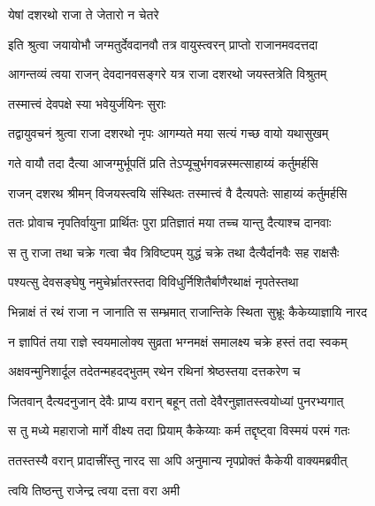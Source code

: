 \onelineshloka
{येषां दशरथो राजा ते जेतारो न चेतरे} %


\twolineshloka
{इति श्रुत्वा जयायोभौ जग्मतुर्देवदानवौ}
{तत्र वायुस्त्वरन् प्राप्तो राजानमवदत्तदा} %



\twolineshloka
{आगन्तव्यं त्वया राजन् देवदानवसङ्गरे}
{यत्र राजा दशरथो जयस्तत्रेति विश्रुतम्} %

\onelineshloka
{तस्मात्त्वं देवपक्षे स्या भवेयुर्जयिनः सुराः}%



\twolineshloka
{तद्वायुवचनं श्रुत्वा राजा दशरथो नृपः}
{आगम्यते मया सत्यं गच्छ वायो यथासुखम्} %

\twolineshloka
{गते वायौ तदा दैत्या आजग्मुर्भूपतिं प्रति}
{तेऽप्यूचुर्भगवन्नस्मत्साहाय्यं कर्तुमर्हसि} %

\twolineshloka
{राजन् दशरथ श्रीमन् विजयस्त्वयि संस्थितः}
{तस्मात्त्वं वै दैत्यपतेः साहाय्यं कर्तुमर्हसि} %

\twolineshloka
{ततः प्रोवाच नृपतिर्वायुना प्रार्थितः पुरा}
{प्रतिज्ञातं मया तच्च यान्तु दैत्याश्च दानवाः} %

\twolineshloka
{स तु राजा तथा चक्रे गत्वा चैव त्रिविष्टपम्}
{युद्धं चक्रे तथा दैत्यैर्दानवैः सह राक्षसैः} %

\twolineshloka
{पश्यत्सु देवसङ्घेषु नमुचेर्भ्रातरस्तदा}
{विविधुर्निशितैर्बाणैरथाक्षं नृपतेस्तथा} %

\twolineshloka
{भिन्नाक्षं तं रथं राजा न जानाति स सम्भ्रमात्}
{राजान्तिके स्थिता सुभ्रूः कैकेय्याज्ञायि नारद} %

\twolineshloka
{न ज्ञापितं तया राज्ञे स्वयमालोक्य सुव्रता}
{भग्नमक्षं समालक्ष्य चक्रे हस्तं तदा स्वकम्} %

\twolineshloka
{अक्षवन्मुनिशार्दूल तदेतन्महदद्भुतम्}
{रथेन रथिनां श्रेष्ठस्तया दत्तकरेण च} %

\twolineshloka
{जितवान् दैत्यदनुजान् देवैः प्राप्य वरान् बहून्}
{ततो देवैरनुज्ञातस्त्वयोध्यां पुनरभ्यगात्} %

\twolineshloka
{स तु मध्ये महाराजो मार्गे वीक्ष्य तदा प्रियाम्}
{कैकेय्याः कर्म तद्दृष्ट्वा विस्मयं परमं गतः} %

\twolineshloka
{ततस्तस्यै वरान् प्रादात्त्रींस्तु नारद सा अपि}
{अनुमान्य नृपप्रोक्तं कैकेयी वाक्यमब्रवीत्} %



\onelineshloka
{त्वयि तिष्ठन्तु राजेन्द्र त्वया दत्ता वरा अमी}%


